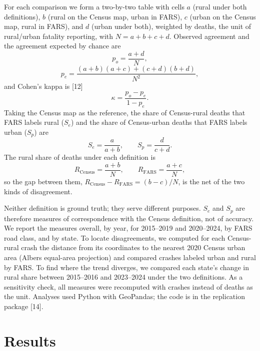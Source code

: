 \documentclass[12pt]{article}
\begin{document}
For each comparison we form a two-by-two table with cells $a$ (rural under both definitions), $b$ (rural on the Census map, urban in FARS), $c$ (urban on the Census map, rural in FARS), and $d$ (urban under both), weighted by deaths, the unit of rural/urban fatality reporting, with $N=a+b+c+d$. Observed agreement and the agreement expected by chance are
\begin{equation}
p_o = \frac{a+d}{N},
\end{equation}
\begin{equation}
p_e = \frac{(a+b)(a+c)+(c+d)(b+d)}{N^2},
\end{equation}
and Cohen's kappa is [12]
\begin{equation}
\kappa = \frac{p_o - p_e}{1 - p_e}.
\end{equation}
Taking the Census map as the reference, the share of Census-rural deaths that FARS labels rural ($S_e$) and the share of Census-urban deaths that FARS labels urban ($S_p$) are
\begin{equation}
S_e = \frac{a}{a+b}, \qquad S_p = \frac{d}{c+d}.
\end{equation}
The rural share of deaths under each definition is
\begin{equation}
R_{\mathrm{Census}} = \frac{a+b}{N}, \qquad R_{\mathrm{FARS}} = \frac{a+c}{N},
\end{equation}
so the gap between them, $R_{\mathrm{Census}}-R_{\mathrm{FARS}} = (b-c)/N$, is the net of the two kinds of disagreement.

Neither definition is ground truth; they serve different purposes. $S_e$ and $S_p$ are therefore measures of correspondence with the Census definition, not of accuracy. We report the measures overall, by year, for 2015--2019 and 2020--2024, by FARS road class, and by state. To locate disagreements, we computed for each Census-rural crash the distance from its coordinates to the nearest 2020 Census urban area (Albers equal-area projection) and compared crashes labeled urban and rural by FARS. To find where the trend diverges, we compared each state's change in rural share between 2015--2016 and 2023--2024 under the two definitions. As a sensitivity check, all measures were recomputed with crashes instead of deaths as the unit. Analyses used Python with GeoPandas; the code is in the replication package [14].

\section{Results}
\end{document}

